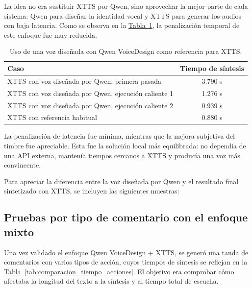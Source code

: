 La idea no era sustituir XTTS por Qwen, sino aprovechar la mejor parte de cada sistema: Qwen para diseñar la identidad vocal y XTTS para generar los audios con baja latencia. Como se observa en la \hyperref[tab:qwen-voicedesign-xtts]{Tabla~\ref*{tab:qwen-voicedesign-xtts}}, la penalización temporal de este enfoque fue muy reducida.

\begin{table}[ht]
\centering
\begin{tabular}{lc}
\toprule
Caso & Tiempo de síntesis \\
\midrule
XTTS con voz diseñada por Qwen, primera pasada & 3.790 s \\
XTTS con voz diseñada por Qwen, ejecución caliente 1 & 1.276 s \\
XTTS con voz diseñada por Qwen, ejecución caliente 2 & 0.939 s \\
XTTS con referencia habitual & 0.880 s \\
\bottomrule
\end{tabular}
\caption{Uso de una voz diseñada con Qwen VoiceDesign como referencia para XTTS.}
\label{tab:qwen-voicedesign-xtts}
\end{table}

La penalización de latencia fue mínima, mientras que la mejora subjetiva del timbre fue apreciable. Esta fue la solución local más equilibrada: no dependía de una API externa, mantenía tiempos cercanos a XTTS y producía una voz más convincente.

Para apreciar la diferencia entre la voz diseñada por Qwen y el resultado final sintetizado con XTTS, se incluyen las siguientes muestras:

\begin{center}
\qquad
{}
\end{center}

\subsection{Pruebas por tipo de comentario con el enfoque mixto}

Una vez validado el enfoque Qwen VoiceDesign + XTTS, se generó una tanda de comentarios con varios tipos de acción, cuyos tiempos de síntesis se reflejan en la \hyperref[tab:comparacion_tiempo_acciones]{Tabla~\ref*{tab:comparacion_tiempo_acciones}}. El objetivo era comprobar cómo afectaba la longitud del texto a la síntesis y al tiempo total de escucha.

